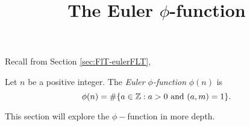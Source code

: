 \documentclass{ximera}
\title{The Euler $\phi$-function}
\begin{document}
\begin{abstract}
\end{abstract}
\maketitle

Recall from Section \cref{sec:FlT-eulerFLT}, 

\begin{defn}
    Let $n$ be a positive integer. The \emph{Euler $\phi$-function} $\phi(n)$ is \[\phi(n)=\#\{a\in\mathbb Z : a>0 \textnormal{ and } (a,m)=1\}.\]
\end{defn}

This section will explore the $\phi-$function in more depth.
\end{document}
